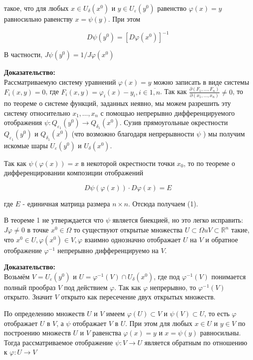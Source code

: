 \documentclass[a4paper,12pt]{article} %
\begin{document}
такое, что для любых $x \in U_{\delta}\left(x^{0}\right)$ и $y \in U_{\varepsilon}\left(y^{0}\right)$ равенство $\varphi(x)=y$ равносильно равенству $x=\psi(y)$. При этом

$$
D \psi\left(y^{0}\right)=\left[D \varphi\left(x^{0}\right)\right]^{-1}
$$

В частности, $J \psi\left(y^{0}\right)=1 / J \varphi\left(x^{0}\right)$

\textbf{Доказательство:}\\
Рассматриваемую систему уравнений $\varphi(x)=y$ можно записать в виде системы $F_{i}(x, y)=0$, где $F_{i}(x, y)=\varphi_{i}(x)-y_{i}, i \in \overline{1, n}$. Так как $\frac{\partial\left(F_{1}, \ldots, F_{n}\right)}{\partial\left(x_{1}, \ldots, x_{n}\right)} \neq 0$, то по теореме о системе функций, заданных неявно, мы можем разрешить эту систему относительно $x_{1}, \ldots, x_{n}$ с помощью непрерывно дифференцируемого отображения $\psi: Q_{\varepsilon_{1}}\left(y^{0}\right) \rightarrow Q_{\delta_{1}}\left(x^{0}\right)$. Сузив прямоугольные окрестности $Q_{\varepsilon_{1}}\left(y^{0}\right)$ и $Q_{\delta_{1}}\left(x^{0}\right)$ (что возможно благодаря непрерывности $\psi$ ) мы получим искомые шары $U_{\varepsilon}\left(y^{0}\right)$ и $U_{\delta}\left(x^{0}\right)$.

Так как $\psi(\varphi(x))=x$ в некоторой окрестности точки $x_{0}$, то по теореме о дифференцировании композиции отображений

$$
D \psi(\varphi(x)) \cdot D \varphi(x)=E
$$

где $E$ - единичная матрица размера $n \times n$. Отсюда получаем (1).

В теореме 1 не утверждается что $\psi$ является биекцией, но это легко исправить:
$J \varphi \neq 0$ в точке $x^{0} \in \Omega$ то существуют открытые множества $U \subset \Omega u V \subset \mathbb{R}^{n}$ такие, что $x^{0} \in U, \varphi\left(x^{0}\right) \in V, \varphi$ взаимно однозначно отображает $U$ на $V$ и обратное отображение $\varphi^{-1}$ непрерывно дифференцируемо на $V$.

\textbf{Доказательство:}\\
Возьмём $V=U_{\varepsilon}\left(y^{0}\right)$ и $U=\varphi^{-1}(V) \cap U_{\delta}\left(x^{0}\right)$, где под $\varphi^{-1}(V)$ понимается полный прообраз $V$ под действием $\varphi$. Так как $\varphi$ непрерывно, то $\varphi^{-1}(V)$ открыто. Значит $V$ открыто как пересечение двух открытых множеств.

По определению множеств $U$ и $V$ имеем $\varphi(U) \subset V$ и $\psi(V) \subset U$, то есть $\varphi$ отображает $U$ в $V$, а $\psi$ отображает $V$ в $U$. При этом для любых $x \in U$ и $y \in V$ по построению множеств $U$ и $V$ равенства $\varphi(x)=y$ и $x=\psi(y)$ равносильны. Тогда рассматриваемое отображение $\psi: V \rightarrow U$ является обратным по отношению к $\varphi: U \rightarrow V$
\end{document}
